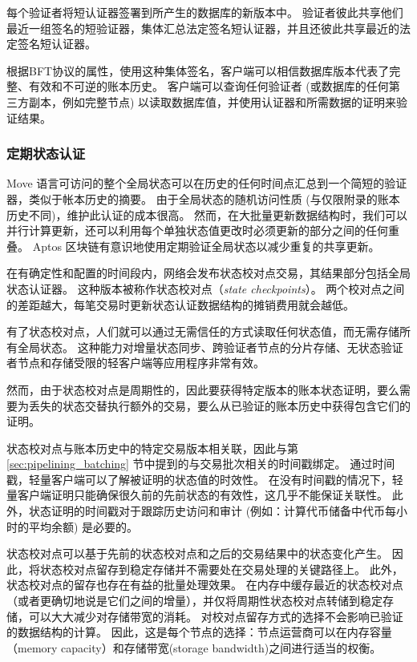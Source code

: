 \documentclass{article}
\begin{document}
每个验证者将短认证器签署到所产生的数据库的新版本中。 验证者彼此共享他们最近一组签名的短验证器，集体汇总法定签名短认证器，并且还彼此共享最近的法定签名短认证器。

根据BFT协议的属性，使用这种集体签名，客户端可以相信数据库版本代表了完整、有效和不可逆的账本历史。 客户端可以查询任何验证者 (或数据库的任何第三方副本，例如完整节点) 以读取数据库值，并使用认证器和所需数据的证明来验证结果。


\subsubsection{定期状态认证}
\label{subsubsec:period_state_certification}

Move 语言可访问的整个全局状态可以在历史的任何时间点汇总到一个简短的验证器，类似于帐本历史的摘要。 由于全局状态的随机访问性质 (与仅限附录的账本历史不同)，维护此认证的成本很高。 然而，在大批量更新数据结构时，我们可以并行计算更新，还可以利用每个单独状态值更改时必须更新的部分之间的任何重叠。 Aptos 区块链有意识地使用定期验证全局状态以减少重复的共享更新。

在有确定性和配置的时间段内，网络会发布状态校对点交易，其结果部分包括全局状态认证器。 这种版本被称作状态校对点（\emph{state checkpoints}）。 两个校对点之间的差距越大，每笔交易时更新状态认证数据结构的摊销费用就会越低。

有了状态校对点，人们就可以通过无需信任的方式读取任何状态值，而无需存储所有全局状态。 这种能力对增量状态同步、跨验证者节点的分片存储、无状态验证者节点和存储受限的轻客户端等应用程序非常有效。

然而，由于状态校对点是周期性的，因此要获得特定版本的账本状态证明，要么需要为丢失的状态交替执行额外的交易，要么从已验证的账本历史中获得包含它们的证明。

状态校对点与账本历史中的特定交易版本相关联，因此与第 \ref{sec:pipelining_batching} 节中提到的与交易批次相关的时间戳绑定。 通过时间戳，轻量客户端可以了解被证明的状态值的时效性。 在没有时间戳的情况下，轻量客户端证明只能确保很久前的先前状态的有效性，这几乎不能保证关联性。 此外，状态证明的时间戳对于跟踪历史访问和审计 (例如：计算代币储备中代币每小时的平均余额) 是必要的。

状态校对点可以基于先前的状态校对点和之后的交易结果中的状态变化产生。 因此，将状态校对点留存到稳定存储并不需要处在交易处理的关键路径上。 此外，状态校对点的留存也存在有益的批量处理效果。 在内存中缓存最近的状态校对点（或者更确切地说是它们之间的增量），并仅将周期性状态校对点转储到稳定存储，可以大大减少对存储带宽的消耗。 对校对点留存方式的选择不会影响已验证的数据结构的计算。 因此，这是每个节点的选择：节点运营商可以在内存容量（memory capacity）和存储带宽(storage bandwidth)之间进行适当的权衡。
\end{document}
